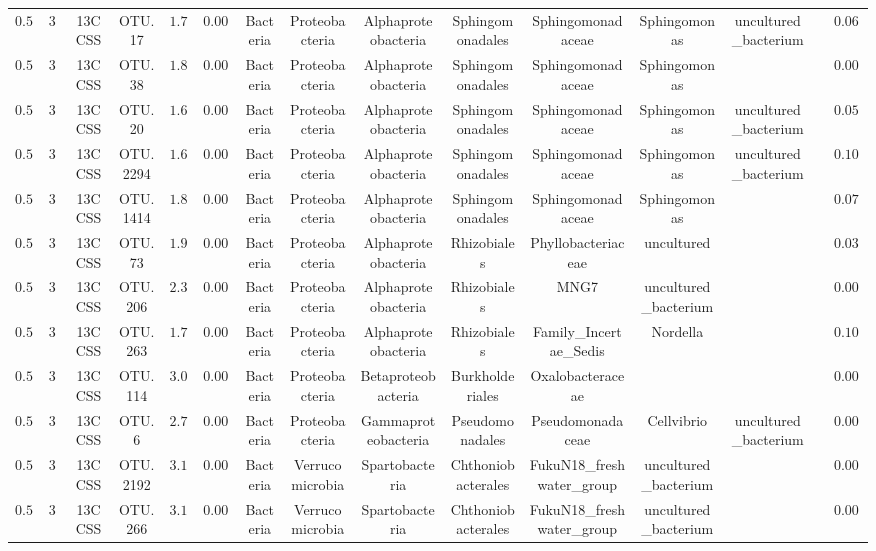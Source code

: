 \begin{table}[!htbp]
\begin{tabular}{@{\extracolsep{5pt}} ccccccccccccccc}
$0.550$ & $30$ & 13CCSS & OTU.17 & $1.794$ & $0.002$ & Bacteria & Proteobacteria & Alphaproteobacteria & Sphingomonadales & Sphingomonadaceae & Sphingomonas & uncultured\_bacterium &  & $0.064$ \\ 
$0.550$ & $30$ & 13CCSS & OTU.38 & $1.822$ & $0.0002$ & Bacteria & Proteobacteria & Alphaproteobacteria & Sphingomonadales & Sphingomonadaceae & Sphingomonas &  &  & $0.007$ \\ 
$0.550$ & $30$ & 13CCSS & OTU.20 & $1.662$ & $0.002$ & Bacteria & Proteobacteria & Alphaproteobacteria & Sphingomonadales & Sphingomonadaceae & Sphingomonas & uncultured\_bacterium &  & $0.058$ \\ 
$0.550$ & $30$ & 13CCSS & OTU.2294 & $1.655$ & $0.004$ & Bacteria & Proteobacteria & Alphaproteobacteria & Sphingomonadales & Sphingomonadaceae & Sphingomonas & uncultured\_bacterium &  & $0.100$ \\ 
$0.550$ & $30$ & 13CCSS & OTU.1414 & $1.869$ & $0.003$ & Bacteria & Proteobacteria & Alphaproteobacteria & Sphingomonadales & Sphingomonadaceae & Sphingomonas &  &  & $0.079$ \\ 
$0.550$ & $30$ & 13CCSS & OTU.73 & $1.947$ & $0.001$ & Bacteria & Proteobacteria & Alphaproteobacteria & Rhizobiales & Phyllobacteriaceae & uncultured &  &  & $0.034$ \\ 
$0.550$ & $30$ & 13CCSS & OTU.206 & $2.307$ & $0.0001$ & Bacteria & Proteobacteria & Alphaproteobacteria & Rhizobiales & MNG7 & uncultured\_bacterium &  &  & $0.002$ \\ 
$0.550$ & $30$ & 13CCSS & OTU.263 & $1.765$ & $0.005$ & Bacteria & Proteobacteria & Alphaproteobacteria & Rhizobiales & Family\_Incertae\_Sedis & Nordella &  &  & $0.100$ \\ 
$0.550$ & $30$ & 13CCSS & OTU.114 & $3.009$ & $0.00000$ & Bacteria & Proteobacteria & Betaproteobacteria & Burkholderiales & Oxalobacteraceae &  &  &  & $0.0001$ \\ 
$0.550$ & $30$ & 13CCSS & OTU.6 & $2.782$ & $0.00000$ & Bacteria & Proteobacteria & Gammaproteobacteria & Pseudomonadales & Pseudomonadaceae & Cellvibrio & uncultured\_bacterium &  & $0.0001$ \\ 
$0.550$ & $30$ & 13CCSS & OTU.2192 & $3.121$ & $0.00000$ & Bacteria & Verrucomicrobia & Spartobacteria & Chthoniobacterales & FukuN18\_freshwater\_group & uncultured\_bacterium &  &  & $0.00005$ \\ 
$0.550$ & $30$ & 13CCSS & OTU.266 & $3.137$ & $0.00000$ & Bacteria & Verrucomicrobia & Spartobacteria & Chthoniobacterales & FukuN18\_freshwater\_group & uncultured\_bacterium &  &  & $0.00005$ \\ 

\end{tabular}
\end{table}
